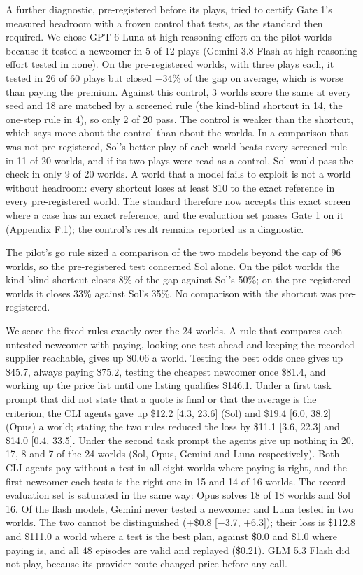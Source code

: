 A further diagnostic, pre-registered before its plays, tried to certify Gate 1's measured headroom with a frozen
control that tests, as the standard then required. We chose GPT-6 Luna at high reasoning effort on the pilot worlds
because it tested a newcomer in 5 of 12 plays (Gemini 3.8 Flash at high reasoning effort tested in none). On the
pre-registered worlds, with three plays each, it tested in 26 of 60 plays but closed −34\% of the gap on average,
which is worse than paying the premium. Against this control, 3 worlds score the same at every seed and 18 are
matched by a screened rule (the kind-blind shortcut in 14, the one-step rule in 4), so only 2 of 20 pass. The
control is weaker than the shortcut, which says more about the control than about the worlds. In a comparison that
was not pre-registered, Sol's better play of each world beats every screened rule in 11 of 20 worlds, and if its two
plays were read as a control, Sol would pass the check in only 9 of 20 worlds. A world that a model fails to exploit
is not a world without headroom: every shortcut loses at least \$10 to the exact reference in every pre-registered
world. The standard therefore now accepts this exact screen where a case has an exact reference, and the evaluation
set passes Gate 1 on it (Appendix F.1); the control's result remains reported as a diagnostic.

The pilot's go rule sized a comparison of the two models beyond the cap of 96 worlds, so the pre-registered test
concerned Sol alone. On the pilot worlds the kind-blind shortcut closes 8\% of the gap against Sol's 50\%; on the
pre-registered worlds it closes 33\% against Sol's 35\%. No comparison with the shortcut was pre-registered.

We score the fixed rules exactly over the 24 worlds. A rule that compares each untested newcomer with paying,
looking one test ahead and keeping the recorded supplier reachable, gives up \$0.06 a world. Testing the best odds
once gives up \$45.7, always paying \$75.2, testing the cheapest newcomer once \$81.4, and working up the price list
until one listing qualifies \$146.1. Under a first task prompt that did not state that a quote is final or that the
average is the criterion, the CLI agents gave up \$12.2 {[}4.3, 23.6{]} (Sol) and \$19.4 {[}6.0, 38.2{]} (Opus) a world;
stating the two rules reduced the loss by \$11.1 {[}3.6, 22.3{]} and \$14.0 {[}0.4, 33.5{]}. Under the second task prompt the
agents give up nothing in 20, 17, 8 and 7 of the 24 worlds (Sol, Opus, Gemini and Luna respectively). Both CLI agents
pay without a test in all eight worlds where paying is right, and the first newcomer each tests is the right one in
15 and 14 of 16 worlds. The record evaluation set is saturated in the same way: Opus solves 18 of 18 worlds and Sol 16.
Of the flash models, Gemini never tested a newcomer and Luna tested in two worlds. The two cannot be
distinguished (+\$0.8 {[}−3.7, +6.3{]}); their loss is \$112.8 and \$111.0 a world where a test is the best plan, against
\$0.0 and \$1.0 where paying is, and all 48 episodes are valid and replayed (\$0.21). GLM 5.3 Flash did not play,
because its provider route changed price before any call.

